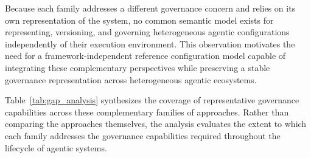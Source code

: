 \documentclass[10pt]{article}
\begin{document}
Because each family addresses a different governance concern and relies on its own representation of the system, no common semantic model exists for representing, versioning, and governing heterogeneous agentic configurations independently of their execution environment.
This observation motivates the need for a framework-independent reference configuration model capable of integrating these complementary perspectives while preserving a stable governance representation across heterogeneous agentic ecosystems.

Table~\ref{tab:gap_analysis} synthesizes the coverage of representative governance capabilities across these complementary families of approaches. Rather than comparing the approaches themselves, the analysis evaluates the extent to which each family addresses the governance capabilities required throughout the lifecycle of agentic systems.
\end{document}
